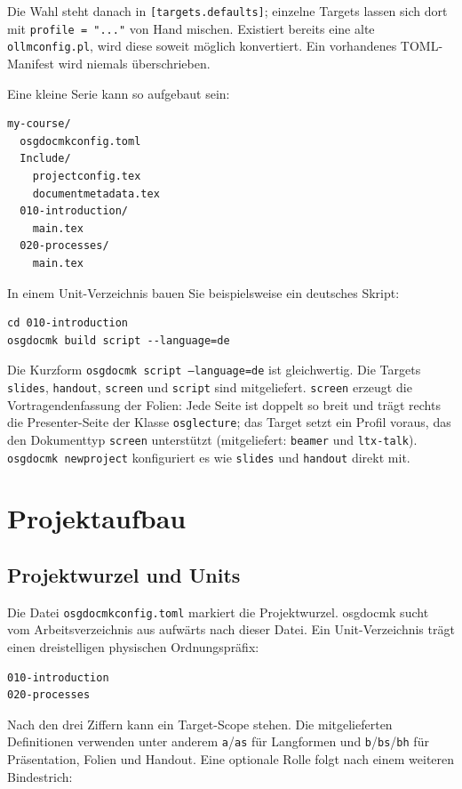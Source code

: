 \documentclass[
load-preamble+
]{osgdoc}
\begin{document}
Die Wahl steht danach in \texttt{[targets.defaults]}; einzelne Targets lassen
sich dort mit \texttt{profile = "..."} von Hand mischen. Existiert bereits
eine alte \texttt{ollmconfig.pl}, wird diese soweit möglich konvertiert. Ein
vorhandenes TOML-Manifest wird niemals überschrieben.

Eine kleine Serie kann so aufgebaut sein:

\begin{verbatim}
my-course/
  osgdocmkconfig.toml
  Include/
    projectconfig.tex
    documentmetadata.tex
  010-introduction/
    main.tex
  020-processes/
    main.tex
\end{verbatim}

In einem Unit-Verzeichnis bauen Sie beispielsweise ein deutsches Skript:

\begin{verbatim}
cd 010-introduction
osgdocmk build script --language=de
\end{verbatim}

Die Kurzform \texttt{osgdocmk script --language=de} ist gleichwertig. Die Targets
\texttt{slides}, \texttt{handout}, \texttt{screen} und \texttt{script} sind
mitgeliefert. \texttt{screen} erzeugt die Vortragendenfassung der Folien: Jede
Seite ist doppelt so breit und trägt rechts die Presenter-Seite der Klasse
\texttt{osglecture}; das Target setzt ein Profil voraus, das den Dokumenttyp
\texttt{screen} unterstützt (mitgeliefert: \texttt{beamer} und
\texttt{ltx-talk}). \texttt{osgdocmk newproject} konfiguriert es wie
\texttt{slides} und \texttt{handout} direkt mit.

\section{Projektaufbau}

\subsection{Projektwurzel und Units}

Die Datei \texttt{osgdocmkconfig.toml} markiert die Projektwurzel. osgdocmk sucht vom
Arbeitsverzeichnis aus aufwärts nach dieser Datei. Ein Unit-Verzeichnis trägt
einen dreistelligen physischen Ordnungspräfix:

\begin{verbatim}
010-introduction
020-processes
\end{verbatim}

Nach den drei Ziffern kann ein Target-Scope stehen. Die mitgelieferten
Definitionen verwenden unter anderem \texttt{a}/\texttt{as} für Langformen
und \texttt{b}/\texttt{bs}/\texttt{bh} für Präsentation, Folien und Handout.
Eine optionale Rolle folgt nach einem weiteren Bindestrich:
\end{document}
